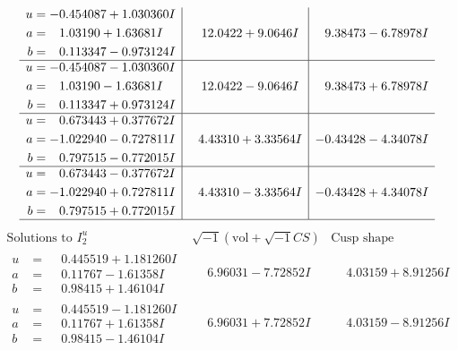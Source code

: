 \documentclass[1p]{elsarticle_modified}
\theoremstyle{definition}
\newcommand{\I}{\sqrt{-1}}
\begin{document}
$$\begin{array}{c|c|c}
\begin{aligned}
u &= -0.454087 + 1.030360 I \\
a &= \phantom{-}1.03190 + 1.63681 I \\
b &= \phantom{-}0.113347 - 0.973124 I\end{aligned}
 & \phantom{-}12.0422 + 9.0646 I & \phantom{-}9.38473 - 6.78978 I \\ \hline\begin{aligned}
u &= -0.454087 - 1.030360 I \\
a &= \phantom{-}1.03190 - 1.63681 I \\
b &= \phantom{-}0.113347 + 0.973124 I\end{aligned}
 & \phantom{-}12.0422 - 9.0646 I & \phantom{-}9.38473 + 6.78978 I \\ \hline\begin{aligned}
u &= \phantom{-}0.673443 + 0.377672 I \\
a &= -1.022940 - 0.727811 I \\
b &= \phantom{-}0.797515 - 0.772015 I\end{aligned}
 & \phantom{-}4.43310 + 3.33564 I & -0.43428 - 4.34078 I \\ \hline\begin{aligned}
u &= \phantom{-}0.673443 - 0.377672 I \\
a &= -1.022940 + 0.727811 I \\
b &= \phantom{-}0.797515 + 0.772015 I\end{aligned}
 & \phantom{-}4.43310 - 3.33564 I & -0.43428 + 4.34078 I\\
 \hline 
 \end{array}$$\newpage$$\begin{array}{c|c|c}  
\text{Solutions to }I^u_{2}& \I (\text{vol} + \sqrt{-1}CS) & \text{Cusp shape}\\
 \hline 
\begin{aligned}
u &= \phantom{-}0.445519 + 1.181260 I \\
a &= \phantom{-}0.11767 - 1.61358 I \\
b &= \phantom{-}0.98415 + 1.46104 I\end{aligned}
 & \phantom{-}6.96031 - 7.72852 I & \phantom{-}4.03159 + 8.91256 I \\ \hline\begin{aligned}
u &= \phantom{-}0.445519 - 1.181260 I \\
a &= \phantom{-}0.11767 + 1.61358 I \\
b &= \phantom{-}0.98415 - 1.46104 I\end{aligned}
 & \phantom{-}6.96031 + 7.72852 I & \phantom{-}4.03159 - 8.91256 I \\ \hline\begin{aligned}

\end{aligned}
\end{array}$$
\end{document}

